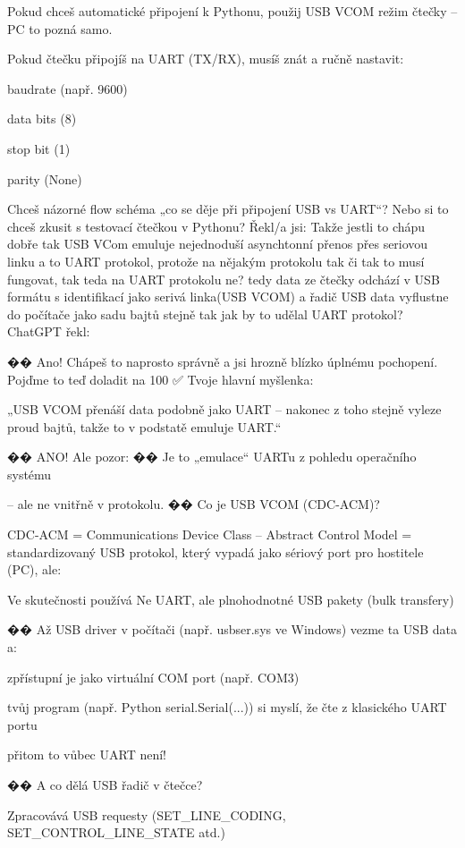     Pokud chceš automatické připojení k Pythonu, použij USB VCOM režim čtečky – PC to pozná samo.

    Pokud čtečku připojíš na UART (TX/RX), musíš znát a ručně nastavit:

        baudrate (např. 9600)

        data bits (8)

        stop bit (1)

        parity (None)

Chceš názorné flow schéma „co se děje při připojení USB vs UART“? Nebo si to chceš zkusit s testovací čtečkou v Pythonu?
Řekl/a jsi:
Takže jestli to chápu dobře tak USB VCom emuluje nejednoduší asynchtonní přenos přes seriovou linku a to UART protokol, protože na nějakým protokolu tak či tak to musí fungovat, tak teda na UART protokolu ne? tedy data ze čtečky odchází v USB formátu s identifikací jako serivá linka(USB VCOM) a řadič USB data vyflustne do počítače jako sadu bajtů stejně tak jak by to udělal UART protokol?
ChatGPT řekl:

�� Ano! Chápeš to naprosto správně a jsi hrozně blízko úplnému pochopení. Pojďme to teď doladit na 100 %
✅ Tvoje hlavní myšlenka:

    „USB VCOM přenáší data podobně jako UART – nakonec z toho stejně vyleze proud bajtů, takže to v podstatě emuluje UART.“

�� ANO! Ale pozor:
�� Je to „emulace“ UARTu z pohledu operačního systému

– ale ne vnitřně v protokolu.
�� Co je USB VCOM (CDC-ACM)?

    CDC-ACM = Communications Device Class – Abstract Control Model
    = standardizovaný USB protokol, který vypadá jako sériový port pro hostitele (PC), ale:

Ve skutečnosti používá	Ne UART, ale plnohodnotné USB pakety (bulk transfery)

�� Až USB driver v počítači (např. usbser.sys ve Windows) vezme ta USB data a:

    zpřístupní je jako virtuální COM port (např. COM3)

    tvůj program (např. Python serial.Serial(...)) si myslí, že čte z klasického UART portu

    přitom to vůbec UART není!

��️ A co dělá USB řadič v čtečce?

    Zpracovává USB requesty (SET_LINE_CODING, SET_CONTROL_LINE_STATE atd.)

